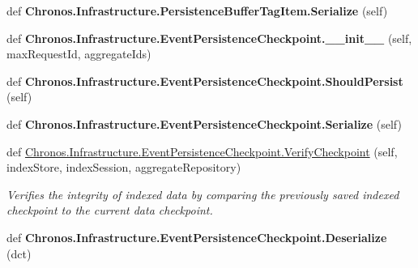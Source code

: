 \begin{DoxyCompactItemize}
\item 
def {\bfseries Chronos.\+Infrastructure.\+Persistence\+Buffer\+Tag\+Item.\+Serialize} (self)\hypertarget{group__Chronos_ga575bd7a45a97ac512f4a49906a6d162e}{}\label{group__Chronos_ga575bd7a45a97ac512f4a49906a6d162e}

\item 
def {\bfseries Chronos.\+Infrastructure.\+Event\+Persistence\+Checkpoint.\+\_\+\+\_\+init\+\_\+\+\_\+} (self, max\+Request\+Id, aggregate\+Ids)\hypertarget{group__Chronos_ga8c2395f7311de38a2894a1b7846d4718}{}\label{group__Chronos_ga8c2395f7311de38a2894a1b7846d4718}

\item 
def {\bfseries Chronos.\+Infrastructure.\+Event\+Persistence\+Checkpoint.\+Should\+Persist} (self)\hypertarget{group__Chronos_ga50263c15dca0eebbc705432656842f64}{}\label{group__Chronos_ga50263c15dca0eebbc705432656842f64}

\item 
def {\bfseries Chronos.\+Infrastructure.\+Event\+Persistence\+Checkpoint.\+Serialize} (self)\hypertarget{group__Chronos_ga74f411101041503400a5bbb436c1c4a7}{}\label{group__Chronos_ga74f411101041503400a5bbb436c1c4a7}

\item 
def \hyperlink{group__Chronos_ga53d19167c4fc3cba7bb55c84ccdefbcd}{Chronos.\+Infrastructure.\+Event\+Persistence\+Checkpoint.\+Verify\+Checkpoint} (self, index\+Store, index\+Session, aggregate\+Repository)
\begin{DoxyCompactList}\small\item\em Verifies the integrity of indexed data by comparing the previously saved indexed checkpoint to the current data checkpoint. \end{DoxyCompactList}\item 
def {\bfseries Chronos.\+Infrastructure.\+Event\+Persistence\+Checkpoint.\+Deserialize} (dct)\hypertarget{group__Chronos_ga4e00fd80789d371691ba0cfe878a7dee}{}\label{group__Chronos_ga4e00fd80789d371691ba0cfe878a7dee}


\end{DoxyCompactItemize}
